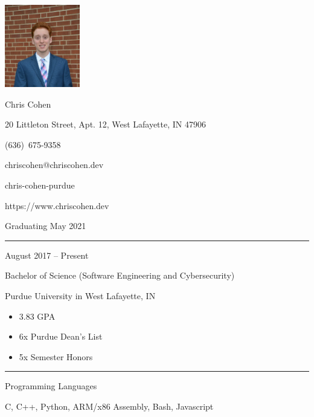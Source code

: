 \documentclass[a4paper]{article}
\newlength{\cvcolumngapwidth}
\newlength{\cvleftcolumnwidth}
\newlength{\cvrightcolumnwidth}
\newcommand{\cvnamestyle}[1]{{\Large\cvnamefont\textcolor{cvnamecolor}{#1}}}
\newcommand{\cvsectionstyle}[1]{{\normalsize\cvsectionfont\textcolor{cvsectioncolor}{#1}}}
\newcommand{\cvtitlestyle}[1]{{\large\cvtitlefont\textcolor{cvtitlecolor}{#1}}}
\newcommand{\cvdurationstyle}[1]{{\small\cvdurationfont\textcolor{cvdurationcolor}{#1}}}
\newcommand{\cvheadingstyle}[1]{{\normalsize\cvheadingfont\textcolor{cvheadingcolor}{#1}}}
\newlength{\cvafteritemskipamount}
\newlength{\cvaftersectionskipamount}
\newlength{\cvbetweensectionandheadingextraskipamount}
\newlength{\cvafternameskipamount}
\newlength{\cvafterpersonalinfolineskipamount}
\newlength{\cvaftertitleskipamount}
\newlength{\cvparskip}
\newcommand{\cvpersonalinfo}[2]{
    \begin{minipage}[t]{\cvleftcolumnwidth}
        \vspace{0mm} %
        \raggedleft #1
    \end{minipage}%
    \hspace{\cvcolumngapwidth}%
    \begin{minipage}[t]{\cvrightcolumnwidth}
        \vspace{0mm} %
        #2
    \end{minipage}

    \vspace{\cvafteritemskipamount}
}
\newcommand{\cvname}[1]{
    \cvnamestyle{#1}

    \vspace{\cvafternameskipamount}
}
\newcommand{\cvpersonalinfolinewithicon}[3]{
    \raisebox{.5\fontcharht\font`E-.5\height}{\texttt{[image: \#2]}}
    #3

    \vspace{\cvafterpersonalinfolineskipamount}
}
\newcommand{\cvsection}[1]{
    \begin{minipage}[t]{\cvleftcolumnwidth}
        \raggedleft\cvsectionstyle{#1}
    \end{minipage}%
    \hspace{\cvcolumngapwidth}%
    \begin{minipage}[t]{\cvrightcolumnwidth}
        \textcolor{cvrulecolor}{\rule{\cvrightcolumnwidth}{0.3mm}}
    \end{minipage}

    \vspace{\cvaftersectionskipamount}
}
\newcommand{\cvitem}[2]{
    \begin{minipage}[t]{\cvleftcolumnwidth}
        \raggedleft #1
    \end{minipage}%
    \hspace{\cvcolumngapwidth}%
    \begin{minipage}[t]{\cvrightcolumnwidth}
        \setlength{\parskip}{\cvparskip} #2
    \end{minipage}

    \vspace{\cvafteritemskipamount}
}
\newcommand{\cvtitle}[1]{
    \cvtitlestyle{#1}

    \vspace{\cvaftertitleskipamount}
    \vspace{-\cvparskip}
}
\begin{document}

\cvpersonalinfo{
    \includegraphics[height=36mm]{me.png}
}{
    \cvname{Chris Cohen}

    \cvpersonalinfolinewithicon{height=4mm}{icons/location.eps}{
        20 Littleton Street, Apt. 12, West Lafayette, IN 47906
    }

    \cvpersonalinfolinewithicon{height=4mm, width=4mm}{icons/phone.eps}{
      (636)\ 675-9358
    }

    \cvpersonalinfolinewithicon{height=4mm}{icons/email.eps}{
      chriscohen@chriscohen.dev
    }

    \cvpersonalinfolinewithicon{height=4mm}{icons/linkedin.eps}{
      chris-cohen-purdue
    }

    \cvpersonalinfolinewithicon{height=4mm}{icons/globe.eps}{
      https://www.chriscohen.dev
    }
    Graduating May 2021
}


\cvsection{EDUCATION}

\cvitem{
    \cvdurationstyle{August 2017 -- Present}
}{
    \cvtitle{Bachelor of Science (Software Engineering and Cybersecurity)}

    Purdue University in West Lafayette, IN

    \begin{itemize}[leftmargin=*]
        \item 3.83 GPA
        \item 6x Purdue Dean's List
        \item 5x Semester Honors
    \end{itemize}
}


\cvsection{TECHNICAL SKILLS}

\vspace{\cvbetweensectionandheadingextraskipamount}

\cvitem{
    \cvheadingstyle{Programming Languages}
}{
    C, C++, Python, ARM/x86 Assembly, Bash, Javascript
}
\end{document}
